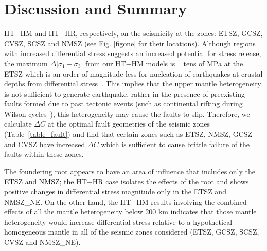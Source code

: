 \documentclass[draft,linenumbers]{agujournal2018}
\begin{document}
\section{Discussion and Summary}
    
    
    HT$-$HM and HT$-$HR, respectively, on the seismicity at the zones: ETSZ, GCSZ, CVSZ, SCSZ and NMSZ (see Fig. \ref{figone} for their locations). Although regions with increased differential stress suggests an increased potential for stress release, the maximum $\Delta|\sigma_1 - \sigma_3|$ from our HT$-$HM models is ~ tens of MPa at the ETSZ which is an order of magnitude less for nucleation of earthquakes at crustal depths from differential stress~\citep[e.g.][]{sibson1990rupture}. This implies that the upper mantle heterogeneity is not sufficient to generate earthquake, rather in the presence of preexisting faults formed due to past tectonic events (such as continental rifting during Wilson cycles~\citep{thomas2006tectonic}), this heterogeneity may cause the faults to slip. Therefore, we calculate $\Delta C$ at the optimal fault geometries of the seismic zones (Table~\ref{table_fault}) and find that certain zones such as ETSZ, NMSZ, GCSZ and CVSZ have increased $\Delta C$ which is sufficient to cause brittle failure of the faults within these zones.

     The foundering root appears to have an area of influence that includes only the ETSZ and NMSZ; the HT$-$HR case isolates the effects of the root and shows positive changes in differential stress magnitude only in the ETSZ and NMSZ\_NE. On the other hand, the HT$-$HM results involving the combined effects of all the mantle heterogeneity below 200 km indicates that those mantle heterogeneity would increase differential stress relative to a hypothetical homogeneous mantle in all of the seismic zones considered (ETSZ, GCSZ, SCSZ, CVSZ and NMSZ\_NE). 
     
\end{document}
